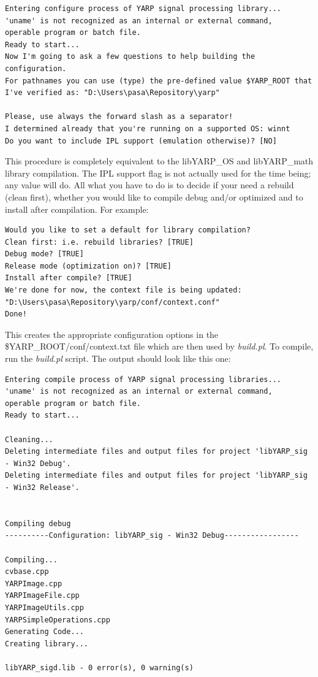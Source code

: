 \begin{verbatim}
Entering configure process of YARP signal processing library...
'uname' is not recognized as an internal or external command,
operable program or batch file.
Ready to start...
Now I'm going to ask a few questions to help building the configuration. 
For pathnames you can use (type) the pre-defined value $YARP_ROOT that 
I've verified as: "D:\Users\pasa\Repository\yarp"

Please, use always the forward slash as a separator!
I determined already that you're running on a supported OS: winnt
Do you want to include IPL support (emulation otherwise)? [NO]
\end{verbatim}

This procedure is completely equivalent to the libYARP\_OS and libYARP\_math library compilation. The IPL support flag is not actually used for the time being; any value will do. All what you have to do is to decide if your need a rebuild (clean first), whether you would like to compile debug and/or optimized and to install after compilation. For example:

\begin{verbatim}
Would you like to set a default for library compilation?
Clean first: i.e. rebuild libraries? [TRUE]
Debug mode? [TRUE]
Release mode (optimization on)? [TRUE]
Install after compile? [TRUE]
We're done for now, the context file is being updated: 
"D:\Users\pasa\Repository\yarp/conf/context.conf"
Done!
\end{verbatim}

This creates the appropriate configuration options in the \$YARP\_ROOT/conf/context.txt file which are then used by {\em build.pl}. To compile, run the {\em build.pl} script. The output should look like this one:

\begin{verbatim}
Entering compile process of YARP signal processing libraries...
'uname' is not recognized as an internal or external command,
operable program or batch file.
Ready to start...

Cleaning...
Deleting intermediate files and output files for project 'libYARP_sig 
- Win32 Debug'.
Deleting intermediate files and output files for project 'libYARP_sig 
- Win32 Release'.


Compiling debug
----------Configuration: libYARP_sig - Win32 Debug-----------------

Compiling...
cvbase.cpp
YARPImage.cpp
YARPImageFile.cpp
YARPImageUtils.cpp
YARPSimpleOperations.cpp
Generating Code...
Creating library...

libYARP_sigd.lib - 0 error(s), 0 warning(s)

\end{verbatim}

